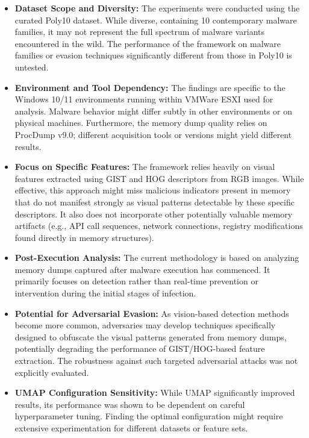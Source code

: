 \begin{itemize}
    \item \textbf{Dataset Scope and Diversity:} The experiments were conducted using the curated Poly10 dataset. While diverse, containing 10 contemporary malware families, it may not represent the full spectrum of malware variants encountered in the wild. The performance of the framework on malware families or evasion techniques significantly different from those in Poly10 is untested.
    \item \textbf{Environment and Tool Dependency:} The findings are specific to the Windows 10/11 environments running within VMWare ESXI used for analysis. Malware behavior might differ subtly in other environments or on physical machines. Furthermore, the memory dump quality relies on ProcDump v9.0; different acquisition tools or versions might yield different results.
    \item \textbf{Focus on Specific Features:} The framework relies heavily on visual features extracted using GIST and HOG descriptors from RGB images. While effective, this approach might miss malicious indicators present in memory that do not manifest strongly as visual patterns detectable by these specific descriptors. It also does not incorporate other potentially valuable memory artifacts (e.g., API call sequences, network connections, registry modifications found directly in memory structures).
    \item \textbf{Post-Execution Analysis:} The current methodology is based on analyzing memory dumps captured after malware execution has commenced. It primarily focuses on detection rather than real-time prevention or intervention during the initial stages of infection.
    \item \textbf{Potential for Adversarial Evasion:} As vision-based detection methods become more common, adversaries may develop techniques specifically designed to obfuscate the visual patterns generated from memory dumps, potentially degrading the performance of GIST/HOG-based feature extraction. The robustness against such targeted adversarial attacks was not explicitly evaluated.
    \item \textbf{UMAP Configuration Sensitivity:} While UMAP significantly improved results, its performance was shown to be dependent on careful hyperparameter tuning. Finding the optimal configuration might require extensive experimentation for different datasets or feature sets.
\end{itemize}

